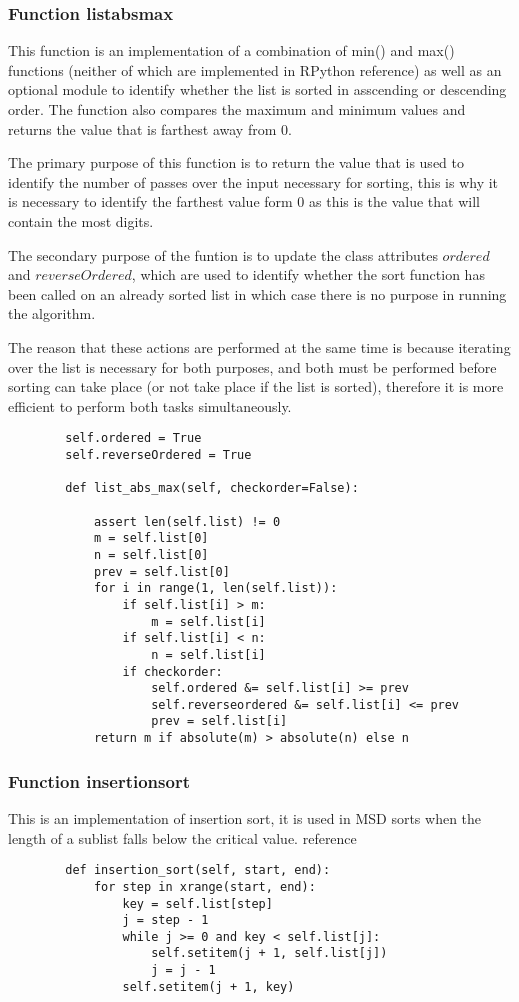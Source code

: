 \documentclass[12pt]{article}
\begin{document}
\subsubsection{Function list\textunderscore abs\textunderscore max}
This function is an implementation of a combination of min() and max() functions (neither of which are implemented in RPython {\color{red}reference}) as well as an optional module to identify whether the list is sorted in asscending or descending order. The function also compares the maximum and minimum values and returns the value that is farthest away from $0$.
\par
The primary purpose of this function is to return the value that is used to identify the number of passes over the input necessary for sorting, this is why it is necessary to identify the farthest value form 0 as this is the value that will contain the most digits.
\par
The secondary purpose of the funtion is to update the class attributes $ordered$ and $reverseOrdered$, which are used to identify whether the sort function has been called on an already sorted list in which case there is no purpose in running the algorithm.
\par
The reason that these actions are performed at the same time is because iterating over the list is necessary for both purposes, and both must be performed before sorting can take place (or not take place if the list is sorted), therefore it is more efficient to perform both tasks simultaneously.
\begin{lstlisting}
        self.ordered = True
        self.reverseOrdered = True

        def list_abs_max(self, checkorder=False):

            assert len(self.list) != 0
            m = self.list[0]
            n = self.list[0]
            prev = self.list[0]
            for i in range(1, len(self.list)):
                if self.list[i] > m:
                    m = self.list[i]
                if self.list[i] < n:
                    n = self.list[i]
                if checkorder:
                    self.ordered &= self.list[i] >= prev
                    self.reverseordered &= self.list[i] <= prev
                    prev = self.list[i]
            return m if absolute(m) > absolute(n) else n
      \end{lstlisting}
\pagebreak
\subsubsection{Function insertion\textunderscore sort}
This is an implementation of insertion sort, it is used in MSD sorts when the length of a sublist falls below the critical value. {\color{red}reference}
\begin{lstlisting}
        def insertion_sort(self, start, end):
            for step in xrange(start, end):
                key = self.list[step]
                j = step - 1
                while j >= 0 and key < self.list[j]:
                    self.setitem(j + 1, self.list[j])
                    j = j - 1
                self.setitem(j + 1, key)
      \end{lstlisting}
\end{document}
